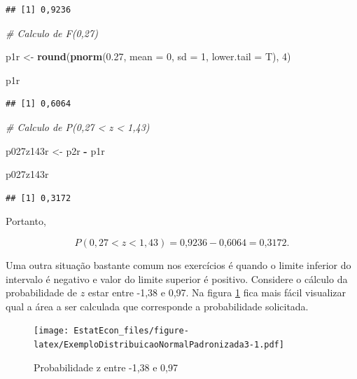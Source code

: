 \documentclass[
]{book}
\newenvironment{Shaded}{\begin{snugshade}}{\end{snugshade}}
\newcommand{\CommentTok}[1]{\textcolor[rgb]{0.56,0.35,0.01}{\textit{#1}}}
\newcommand{\DataTypeTok}[1]{\textcolor[rgb]{0.13,0.29,0.53}{#1}}
\newcommand{\DecValTok}[1]{\textcolor[rgb]{0.00,0.00,0.81}{#1}}
\newcommand{\FloatTok}[1]{\textcolor[rgb]{0.00,0.00,0.81}{#1}}
\newcommand{\KeywordTok}[1]{\textcolor[rgb]{0.13,0.29,0.53}{\textbf{#1}}}
\newcommand{\NormalTok}[1]{#1}
\newcommand{\OperatorTok}[1]{\textcolor[rgb]{0.81,0.36,0.00}{\textbf{#1}}}
\newcommand{\StringTok}[1]{\textcolor[rgb]{0.31,0.60,0.02}{#1}}
\begin{document}
\begin{verbatim}
## [1] 0,9236
\end{verbatim}

\begin{Shaded}
\begin{Highlighting}[]
\CommentTok{# Calculo de F(0,27)}

\NormalTok{p1r <-}\StringTok{ }\KeywordTok{round}\NormalTok{(}\KeywordTok{pnorm}\NormalTok{(}\FloatTok{0.27}\NormalTok{, }\DataTypeTok{mean =} \DecValTok{0}\NormalTok{, }\DataTypeTok{sd =} \DecValTok{1}\NormalTok{, }\DataTypeTok{lower.tail =}\NormalTok{ T), }
    \DecValTok{4}\NormalTok{)}

\NormalTok{p1r}
\end{Highlighting}
\end{Shaded}

\begin{verbatim}
## [1] 0,6064
\end{verbatim}

\begin{Shaded}
\begin{Highlighting}[]
\CommentTok{# Calculo de P(0,27 < z < 1,43)}

\NormalTok{p027z143r <-}\StringTok{ }\NormalTok{p2r }\OperatorTok{-}\StringTok{ }\NormalTok{p1r}


\NormalTok{p027z143r}
\end{Highlighting}
\end{Shaded}

\begin{verbatim}
## [1] 0,3172
\end{verbatim}

Portanto,

\[
  P(0,27 < z < 1,43) = \text{0,9236} - \text{0,6064} = \text{0,3172}.
\]

Uma outra situação bastante comum nos exercícios é quando o limite inferior do intervalo é negativo e valor do limite superior é positivo. Considere o cálculo da probabilidade de \(z\) estar entre -1,38 e 0,97. Na figura \ref{fig:ExemploDistribuicaoNormalPadronizada3} fica mais fácil visualizar qual a área a ser calculada que corresponde a probabilidade solicitada.

\begin{figure}
\centering
\texttt{[image: EstatEcon\_files/figure-latex/ExemploDistribuicaoNormalPadronizada3-1.pdf]}
\caption{\label{fig:ExemploDistribuicaoNormalPadronizada3}Probabilidade z entre -1,38 e 0,97}
\end{figure}
\end{document}
